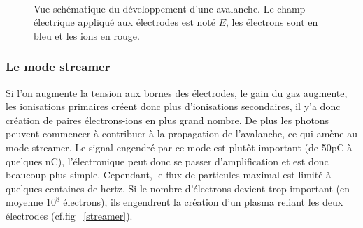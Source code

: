 \begin{figure}[ht!]
\centering
{}
\hfill
{}
\\
\hfill
{}
\caption{Vue schématique du développement d'une avalanche. Le champ électrique appliqué aux électrodes est noté $E$, les électrons sont en bleu et les ions en rouge.}
\label{avalanche}
\end{figure}

\subsubsection{Le mode streamer}
Si l'on augmente la tension aux bornes des électrodes, le gain du gaz augmente, les ionisations primaires créent donc plus d'ionisations secondaires, il y'a donc création de paires électrons-ions  en plus grand nombre. De plus les photons peuvent commencer à contribuer à la propagation de l'avalanche, ce qui amène au mode streamer. Le signal engendré par ce mode est plutôt important (de 50pC à quelques nC), l'électronique peut donc se passer d'amplification et est donc beaucoup plus simple. Cependant, le flux de particules maximal est limité à quelques centaines de hertz. Si le nombre d'électrons devient trop important (en moyenne $10^{8}$ électrons), ils engendrent la création d'un plasma reliant les deux électrodes (cf.fig~ \ref{streamer}).

